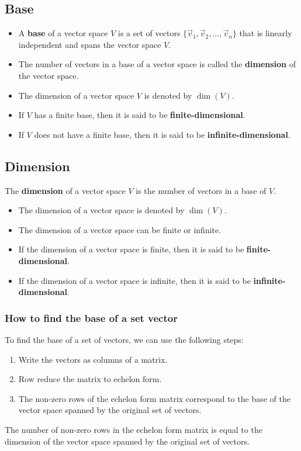 \subsection{Base}

\begin{itemize}[label=$-$]
\item A \textbf{base} of a vector space $V$ is a set of vectors $\{\vec{v}_1, \vec{v}_2, \ldots, \vec{v}_n\}$ that is linearly independent and spans the vector space $V$.
\item The number of vectors in a base of a vector space is called the \textbf{dimension} of the vector space.
\item The dimension of a vector space $V$ is denoted by $\dim(V)$.
\item If $V$ has a finite base, then it is said to be \textbf{finite-dimensional}.
\item If $V$ does not have a finite base, then it is said to be \textbf{infinite-dimensional}.
\end{itemize}

\subsection{Dimension}
The \textbf{dimension} of a vector space $V$ is the number of vectors in a base of $V$.

\begin{itemize}[label=$-$]
	\item The dimension of a vector space is denoted by $\dim(V)$.
	\item The dimension of a vector space can be finite or infinite.
	\item If the dimension of a vector space is finite, then it is said to be \textbf{finite-dimensional}.
	\item If the dimension of a vector space is infinite, then it is said to be \textbf{infinite-dimensional}.
\end{itemize}

\subsubsection{How to find the base of a set vector}
To find the base of a set of vectors, we can use the following steps:
\begin{enumerate}
	\item Write the vectors as columns of a matrix.
	\item Row reduce the matrix to echelon form.
	\item The non-zero rows of the echelon form matrix correspond to the base of the vector space spanned by the original set of vectors.
\end{enumerate}
The number of non-zero rows in the echelon form matrix is equal to the dimension of the vector space spanned by the original set of vectors.

